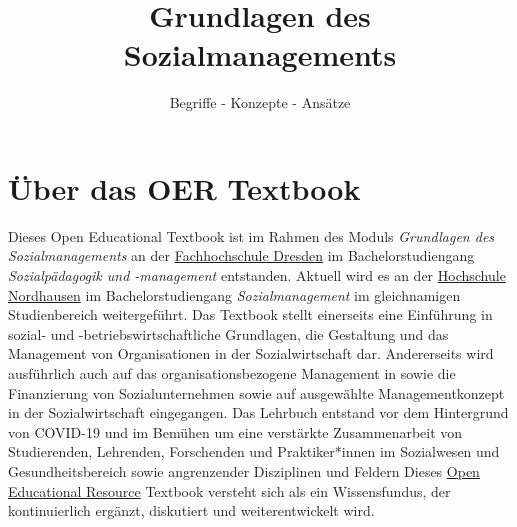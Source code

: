 \documentclass[
  letterpaper,
]{book}
\title{Grundlagen des Sozialmanagements}
\subtitle{Begriffe - Konzepte - Ansätze}
\author{}
\date{}
\let\oldmaketitle\maketitle
\renewcommand*\contentsname{Table of contents}
\newcommand\contentsname{Table of contents}
\begin{document}
\frontmatter
\maketitle

\begin{center}

\end{center}
\let\maketitle\oldmaketitle
\maketitle
\AtBeginShipoutNext{\AtBeginShipoutDiscard}
\mainmatter

\renewcommand*\contentsname{Table of contents}
{
\hypersetup{linkcolor=}
\setcounter{tocdepth}{2}
\tableofcontents
}

\mainmatter
{}

\chapter*{Über das OER Textbook}\label{uxfcber-das-oer-textbook}


Dieses Open Educational Textbook ist im Rahmen des Moduls
\emph{Grundlagen des Sozialmanagements} an der
\href{https://www.fh-dresden.de}{Fachhochschule Dresden} im
Bachelorstudiengang \emph{Sozialpädagogik und -management} entstanden.
Aktuell wird es an der \href{https://www.hs-nordhausen.de}{Hochschule
Nordhausen} im Bachelorstudiengang \emph{Sozialmanagement} im
gleichnamigen Studienbereich weitergeführt. Das Textbook stellt
einerseits eine Einführung in sozial- und -betriebswirtschaftliche
Grundlagen, die Gestaltung und das Management von Organisationen in der
Sozialwirtschaft dar. Andererseits wird ausführlich auch auf das
organisationsbezogene Management in sowie die Finanzierung von
Sozialunternehmen sowie auf ausgewählte Managementkonzept in der
Sozialwirtschaft eingegangen. Das Lehrbuch entstand vor dem Hintergrund
von COVID-19 und im Bemühen um eine verstärkte Zusammenarbeit von
Studierenden, Lehrenden, Forschenden und Praktiker*innen im Sozialwesen
und Gesundheitsbereich sowie angrenzender Disziplinen und Feldern Dieses
\href{https://de.wikipedia.org/wiki/Open_Educational_Resources}{Open
Educational Resource} Textbook versteht sich als ein Wissensfundus, der
kontinuierlich ergänzt, diskutiert und weiterentwickelt wird.
\end{document}
